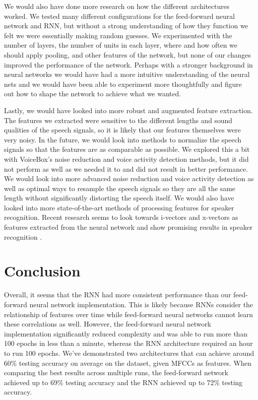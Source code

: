 \documentclass{article}
\begin{document}
We would also have done more research on how the different architectures worked.
We tested many different configurations for the feed-forward neural network and RNN, but without a strong understanding of how they function we felt we were essentially making random guesses.
We experimented with the number of layers, the number of units in each layer, where and how often we should apply pooling, and other features of the network, but none of our changes improved the performance of the network.
Perhaps with a stronger background in neural networks we would have had a more intuitive understanding of the neural nets and we would have been able to experiment more thoughtfully and figure out how to shape the network to achieve what we wanted.

Lastly, we would have looked into more robust and augmented feature extraction.
The features we extracted were sensitive to the different lengths and sound qualities of the speech signals, so it is likely that our features themselves were very noisy.
In the future, we would look into methods to normalize the speech signals so that the features are as comparable as possible.
We explored this a bit with VoiceBox’s noise reduction and voice activity detection methods, but it did not perform as well as we needed it to and did not result in better performance.
We would look into more advanced noise reduction and voice activity detection as well as optimal ways to resample the speech signals so they are all the same length without significantly distorting the speech itself.
We would also have looked into more state-of-the-art methods of processing features for speaker recognition.
Recent research seems to look towards i-vectors and x-vectors as features extracted from the neural network and show promising results in speaker recognition \cite{ivector, xvector}.


\section{Conclusion}
\label{sec:conclusion}

Overall, it seems that the RNN had more consistent performance than our feed-forward neural network implementation.
This is likely because RNNs consider the relationship of features over time while feed-forward neural networks cannot learn these correlations as well.
However, the feed-forward neural network implementation significantly reduced complexity and was able to run more than 100 epochs in less than a minute, whereas the RNN architecture required an hour to run 100 epochs.
We’ve demonstrated two architectures that can achieve around 60\% testing accuracy on average on the dataset, given MFCCs as features.
When comparing the best results across multiple runs, the feed-forward network achieved up to 69\% testing accuracy and the RNN achieved up to 72\% testing accuracy.



\end{document}
